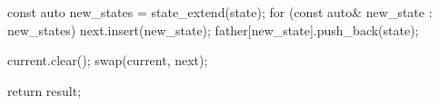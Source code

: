 \begin{Codex}[label=bfs_template.cpp]
{{{            const auto new_states = state_extend(state);
            for (const auto& new_state : new_states) {
                next.insert(new_state);
                father[new_state].push_back(state);
            }
        }

        current.clear();
        swap(current, next);
    }

    return result;
}
\end{Codex}


